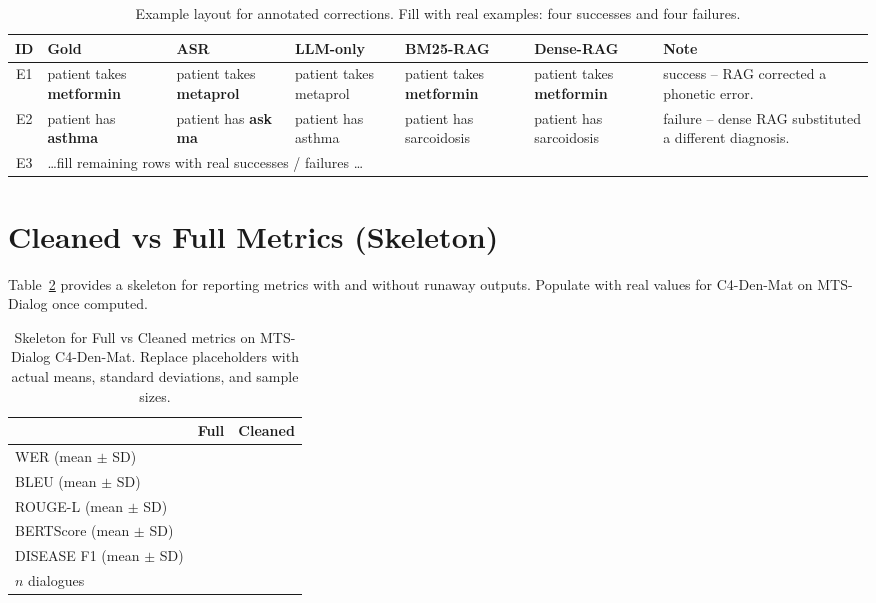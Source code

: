 \documentclass[11pt,a4paper]{article}
\begin{document}
\begin{table}[!t]
\centering
\caption{Example layout for annotated corrections. Fill with real examples:
four successes and four failures.}
\label{tab:annotated-examples}
\small
\setlength{\tabcolsep}{3pt}
\renewcommand{\arraystretch}{1.2}
\begin{tabularx}{\textwidth}{cXXXXXX}
\toprule
\textbf{ID} & \textbf{Gold} & \textbf{ASR} & \textbf{LLM-only} &
\textbf{BM25-RAG} & \textbf{Dense-RAG} & \textbf{Note} \\
\midrule
E1 & patient takes \textbf{metformin} &
     patient takes \textbf{metaprol} &
     patient takes metaprol &
     patient takes \textbf{metformin} &
     patient takes \textbf{metformin} &
     success -- RAG corrected a phonetic error. \\
E2 & patient has \textbf{asthma} &
     patient has \textbf{ask ma} &
     patient has asthma &
     patient has sarcoidosis &
     patient has sarcoidosis &
     failure -- dense RAG substituted a different diagnosis. \\
E3 & \multicolumn{6}{l}{\dots fill remaining rows with real successes / failures \dots} \\
\bottomrule
\end{tabularx}
\end{table}

\section{Cleaned vs Full Metrics (Skeleton)}
\label{app:cleaned-metrics}

Table~\ref{tab:full-vs-cleaned} provides a skeleton for reporting metrics with
and without runaway outputs. Populate with real values for C4-Den-Mat on
MTS-Dialog once computed.

\begin{table}[H]
\centering
\caption{Skeleton for Full vs Cleaned metrics on MTS-Dialog C4-Den-Mat.
Replace placeholders with actual means, standard deviations, and sample sizes.}
\label{tab:full-vs-cleaned}
\small
\renewcommand{\arraystretch}{1.15}
\begin{tabular}{lcc}
\toprule
 & \textbf{Full} & \textbf{Cleaned} \\
\midrule
WER (mean $\pm$ SD)      & \textemdash{} & \textemdash{} \\
BLEU (mean $\pm$ SD)     & \textemdash{} & \textemdash{} \\
ROUGE-L (mean $\pm$ SD)  & \textemdash{} & \textemdash{} \\
BERTScore (mean $\pm$ SD)& \textemdash{} & \textemdash{} \\
DISEASE F1 (mean $\pm$ SD) & \textemdash{} & \textemdash{} \\
$n$ dialogues            & \textemdash{} & \textemdash{} \\
\bottomrule
\end{tabular}
\end{table}
\end{document}
